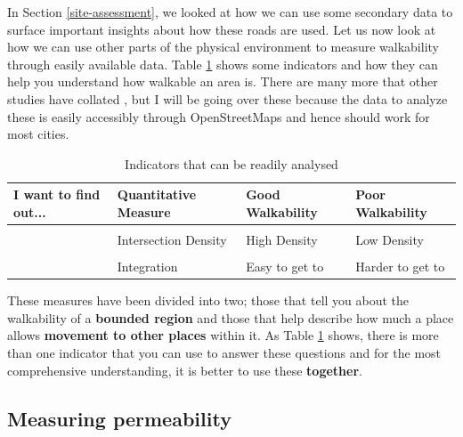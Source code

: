 \documentclass[
]{latex/krantz}
\begin{document}
In Section \ref{site-assessment}, we looked at how we can use some secondary data to surface important insights about how these roads are used. Let us now look at how we can use other parts of the physical environment to measure walkability through easily available data. Table \ref{tab:physical-indicators} shows some indicators and how they can help you understand how walkable an area is. There are many more that other studies have collated \autocite{knapskogExploringWaysMeasuring2019a}, but I will be going over these because the data to analyze these is easily accessibly through OpenStreetMaps and hence should work for most cities.

\renewcommand{\arraystretch}{2}

\begin{table}

\caption{\label{tab:physical-indicators}Indicators that can be readily analysed}
\centering
\begin{tabular}[t]{>{\raggedright\arraybackslash}p{10em}lll}
\toprule
I want to find out... & Quantitative Measure & Good Walkability & Poor Walkability\\
\midrule
\textbf{\cellcolor{gray!6}{If it is easy to move within a specific place}} & \cellcolor{gray!6}{Permeability} & \cellcolor{gray!6}{Easy to move around} & \cellcolor{gray!6}{Hard to move around}\\
\textbf{} & Intersection Density & High Density & Low Density\\
\textbf{\cellcolor{gray!6}{If it is easy to move from one place to another}} & \cellcolor{gray!6}{Connectedness} & \cellcolor{gray!6}{Well connected} & \cellcolor{gray!6}{Poorly Connected}\\
\textbf{} & Integration & Easy to get to & Harder to get to\\
\bottomrule
\end{tabular}
\end{table}

These measures have been divided into two; those that tell you about the walkability of a \textbf{bounded region} and those that help describe how much a place allows \textbf{movement to other places} within it. As Table \ref{tab:physical-indicators} shows, there is more than one indicator that you can use to answer these questions and for the most comprehensive understanding, it is better to use these \textbf{together}.

\hypertarget{block-sizes}{%
\subsection{Measuring permeability}\label{block-sizes}}
\end{document}
